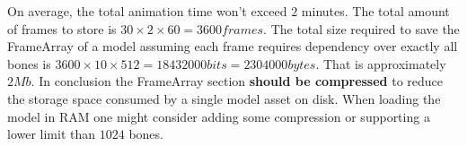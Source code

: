 On average, the total animation time won't exceed $2$ minutes.\newline
The total amount of frames to store is $30 \times 2 \times 60 = 3600frames$.\newline
The total size required to save the FrameArray of a model assuming each frame requires dependency over exactly all bones is $3600 \times 10 \times 512 = 18432000bits = 2304000bytes$. That is approximately $2Mb$.\newline
\newline
In conclusion the FrameArray section \textbf{should be compressed} to reduce the storage space consumed by a single model asset on disk. When loading the model in RAM one might consider adding some compression or supporting a lower limit than $1024$ bones.